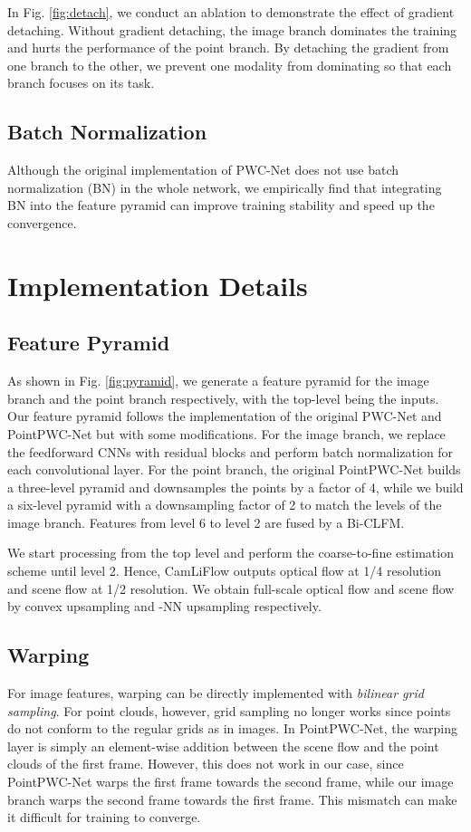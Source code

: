 \documentclass[10pt,twocolumn,letterpaper]{article}
\begin{document}
In Fig. \ref{fig:detach}, we conduct an ablation to demonstrate the effect of gradient detaching. Without gradient detaching, the image branch dominates the training and hurts the performance of the point branch. By detaching the gradient from one branch to the other, we prevent one modality from dominating so that each branch focuses on its task.

\subsection{Batch Normalization} Although the original implementation of PWC-Net \cite{sun2018pwc} does not use batch normalization (BN) \cite{ioffe2015batchnorm} in the whole network, we empirically find that integrating BN into the feature pyramid can improve training stability and speed up the convergence.

\section{Implementation Details}

\subsection{Feature Pyramid} As shown in Fig. \ref{fig:pyramid}, we generate a feature pyramid for the image branch and the point branch respectively, with the top-level being the inputs. Our feature pyramid follows the implementation of the original PWC-Net \cite{sun2018pwc} and PointPWC-Net \cite{wu2019pointpwc} but with some modifications. For the image branch, we replace the feedforward CNNs with residual blocks \cite{he2015resnet} and perform batch normalization for each convolutional layer. For the point branch, the original PointPWC-Net builds a three-level pyramid and downsamples the points by a factor of 4, while we build a six-level pyramid with a downsampling factor of 2 to match the levels of the image branch. Features from level 6 to level 2 are fused by a Bi-CLFM.

We start processing from the top level and perform the coarse-to-fine estimation scheme until level 2. Hence, CamLiFlow outputs optical flow at 1/4 resolution and scene flow at 1/2 resolution. We obtain full-scale optical flow and scene flow by convex upsampling \cite{teed2020raft} and -NN upsampling respectively.

\subsection{Warping} For image features, warping can be directly implemented with \textit{bilinear grid sampling}. For point clouds, however, grid sampling no longer works since points do not conform to the regular grids as in images. In PointPWC-Net, the warping layer is simply an element-wise addition between the scene flow and the point clouds of the first frame. However, this does not work in our case, since PointPWC-Net warps the first frame towards the second frame, while our image branch warps the second frame towards the first frame. This mismatch can make it difficult for training to converge.
\end{document}
